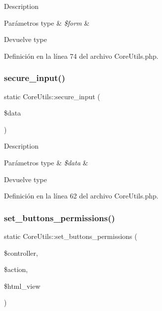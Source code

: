 Description 
\begin{DoxyParams}[1]{Parámetros}
type & {\em \$form} & \\
\hline
\end{DoxyParams}
\begin{DoxyReturn}{Devuelve}
type 
\end{DoxyReturn}


Definición en la línea 74 del archivo Core\+Utils.\+php.

\mbox{\label{class_core_utils_a712603fe257899a1fb36127c08ae6c3f}} 
\subsubsection{\texorpdfstring{secure\_input()}{secure\_input()}}
{\footnotesize\ttfamily static Core\+Utils\+::secure\+\_\+input (\begin{DoxyParamCaption}\item[{}]{\$data }\end{DoxyParamCaption})\hspace{0.3cm}{\ttfamily [static]}}

Description 
\begin{DoxyParams}[1]{Parámetros}
type & {\em \$data} & \\
\hline
\end{DoxyParams}
\begin{DoxyReturn}{Devuelve}
type 
\end{DoxyReturn}


Definición en la línea 62 del archivo Core\+Utils.\+php.

\mbox{\label{class_core_utils_ac7ddc4fe9d11f5922beb99a21e01d716}} 
\subsubsection{\texorpdfstring{set\_buttons\_permissions()}{set\_buttons\_permissions()}}
{\footnotesize\ttfamily static Core\+Utils\+::set\+\_\+buttons\+\_\+permissions (\begin{DoxyParamCaption}\item[{}]{\$controller,  }\item[{}]{\$action,  }\item[{}]{\$html\+\_\+view }\end{DoxyParamCaption})\hspace{0.3cm}{\ttfamily [static]}}

